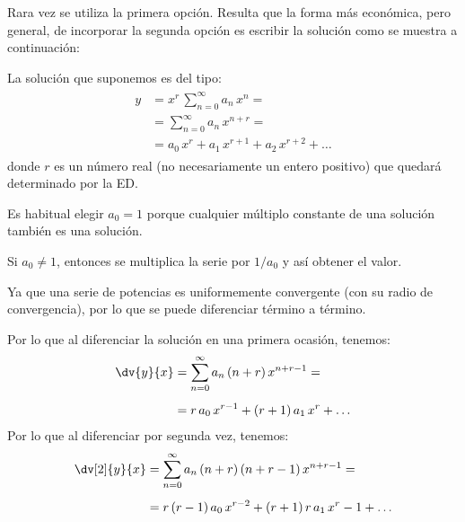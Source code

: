 Rara vez se utiliza la primera opción. Resulta que la forma más económica, pero general, de incorporar la segunda opción es escribir la solución como se muestra a continuación:
\par
La solución que suponemos es del tipo:
\begin{align}
\begin{aligned}
y &= x^{r} \, \sum_{n=0}^{\infty} a_{n} \, x^{n} = \\[0.5em]
&= \sum_{n=0}^{\infty} a_{n} \, x^{n+r} = \\[0.5em]
&= a_{0} \, x^{r} + a_{1} \, x^{r+1} + a_{2} \, x^{r+2} + \ldots
\end{aligned}
\label{eq:ecuacion_26_08}    
\end{align}
donde $r$ es un número real (no necesariamente un entero positivo) que quedará determinado por la ED.
\par
Es habitual elegir $a_{0} = 1$ porque cualquier múltiplo constante de una solución también es una solución.
\par
Si $a_{0} \neq 1$, entonces se multiplica la serie por $1/a_{0}$ y así obtener el valor.
\par
Ya que una serie de potencias es uniformemente convergente (con su radio de convergencia), por lo que se puede diferenciar término a término.
\par
Por lo que al diferenciar la solución en una primera ocasión, tenemos:
\begin{align}
\begin{aligned}
\dv{y}{x} &= \sum_{n=0}^{\infty} a_{n} \, (n + r) \, x^{n+r-1} = \\[0.5em]
&= r \, a_{0} \, x^{r-1} + (r + 1) \, a_{1} \, x^{r} + \ldots
\end{aligned}
\label{eq:ecuacion_26_09a}
\end{align}
Por lo que al diferenciar por segunda vez, tenemos:
\begin{align}
\begin{aligned}
\dv[2]{y}{x} &= \sum_{n=0}^{\infty} a_{n} \, (n + r) \, (n + r - 1) \, x^{n+r-1} = \\[0.5em]
&= r \, (r - 1) \, a_{0} \, x^{r-2} + (r + 1) \, r \, a_{1} \, x^{r}-1 + \ldots
\end{aligned}
\label{eq:ecuacion_26_09b}
\end{align}

